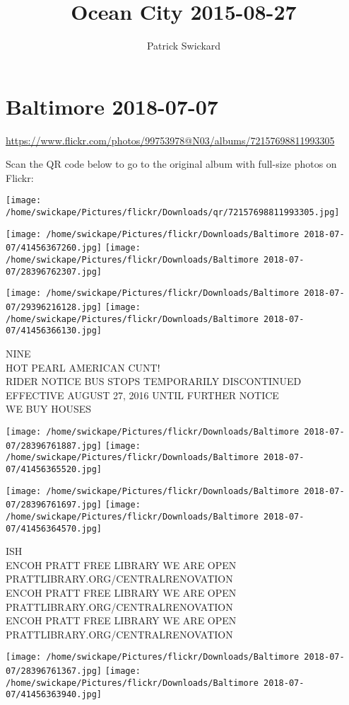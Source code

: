 \documentclass[10pt,letterpaper]{article}
\title{Ocean City 2015-08-27}
\author{Patrick Swickard}
\date{}
\begin{document}
\section*{Baltimore 2018-07-07}

\url{https://www.flickr.com/photos/99753978@N03/albums/72157698811993305}

Scan the QR code below to go to the original album with full-size photos on Flickr:

\texttt{[image: /home/swickape/Pictures/flickr/Downloads/qr/72157698811993305.jpg]}
\pagebreak

\texttt{[image: /home/swickape/Pictures/flickr/Downloads/Baltimore 2018-07-07/41456367260.jpg]}
\texttt{[image: /home/swickape/Pictures/flickr/Downloads/Baltimore 2018-07-07/28396762307.jpg]}

\texttt{[image: /home/swickape/Pictures/flickr/Downloads/Baltimore 2018-07-07/29396216128.jpg]}
\texttt{[image: /home/swickape/Pictures/flickr/Downloads/Baltimore 2018-07-07/41456366130.jpg]}

NINE\\
HOT PEARL AMERICAN CUNT!\\
RIDER NOTICE BUS STOPS TEMPORARILY DISCONTINUED EFFECTIVE AUGUST 27, 2016 UNTIL FURTHER NOTICE\\
WE BUY HOUSES
\pagebreak

\texttt{[image: /home/swickape/Pictures/flickr/Downloads/Baltimore 2018-07-07/28396761887.jpg]}
\texttt{[image: /home/swickape/Pictures/flickr/Downloads/Baltimore 2018-07-07/41456365520.jpg]}

\texttt{[image: /home/swickape/Pictures/flickr/Downloads/Baltimore 2018-07-07/28396761697.jpg]}
\texttt{[image: /home/swickape/Pictures/flickr/Downloads/Baltimore 2018-07-07/41456364570.jpg]}

ISH\\
ENCOH PRATT FREE LIBRARY WE ARE OPEN PRATTLIBRARY.ORG/CENTRALRENOVATION\\
ENCOH PRATT FREE LIBRARY WE ARE OPEN PRATTLIBRARY.ORG/CENTRALRENOVATION\\
ENCOH PRATT FREE LIBRARY WE ARE OPEN PRATTLIBRARY.ORG/CENTRALRENOVATION
\pagebreak

\texttt{[image: /home/swickape/Pictures/flickr/Downloads/Baltimore 2018-07-07/28396761367.jpg]}
\texttt{[image: /home/swickape/Pictures/flickr/Downloads/Baltimore 2018-07-07/41456363940.jpg]}
\end{document}
